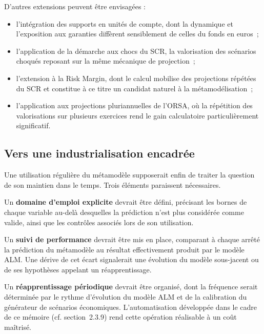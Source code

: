 D'autres extensions peuvent être envisagées :

\begin{itemize}
  \item l'intégration des supports en unités de compte, dont la dynamique et l'exposition aux garanties diffèrent sensiblement de celles du fonds en euros~;
  \item l'application de la démarche aux chocs du SCR, la valorisation des scénarios choqués reposant sur la même mécanique de projection~;
  \item l'extension à la Risk Margin, dont le calcul mobilise des projections répétées du SCR et constitue à ce titre un candidat naturel à la métamodélisation~;
  \item l'application aux projections pluriannuelles de l'ORSA, où la répétition des valorisations sur plusieurs exercices rend le gain calculatoire particulièrement significatif.
\end{itemize}

\subsection{Vers une industrialisation encadrée}

Une utilisation régulière du métamodèle supposerait enfin de traiter la question de son maintien dans le temps. Trois éléments paraissent nécessaires.

Un \textbf{domaine d'emploi explicite} devrait être défini, précisant les bornes de chaque variable au-delà desquelles la prédiction n'est plus considérée comme valide, ainsi que les contrôles associés lors de son utilisation.

Un \textbf{suivi de performance} devrait être mis en place, comparant à chaque arrêté la prédiction du métamodèle au résultat effectivement produit par le modèle ALM. Une dérive de cet écart signalerait une évolution du modèle sous-jacent ou de ses hypothèses appelant un réapprentissage.

Un \textbf{réapprentissage périodique} devrait être organisé, dont la fréquence serait déterminée par le rythme d'évolution du modèle ALM et de la calibration du générateur de scénarios économiques. L'automatisation développée dans le cadre de ce mémoire (cf. section~2.3.9) rend cette opération réalisable à un coût maîtrisé.

